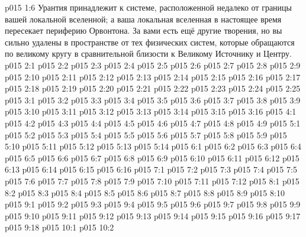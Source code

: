 \vs p015 1:6 Урантия принадлежит к системе, расположенной недалеко от границы вашей локальной вселенной; а ваша локальная вселенная в настоящее время пересекает периферию Орвонтона. За вами есть ещё другие творения, но вы сильно удалены в пространстве от тех физических систем, которые обращаются по великому кругу в сравнительной близости к Великому Источнику и Центру.
\vs p015 2:1 
\vs p015 2:2 \pc 
\vs p015 2:3 
\vs p015 2:4 
\vs p015 2:5 
\vs p015 2:6 
\vs p015 2:7 
\vs p015 2:8 
\vs p015 2:9 
\vs p015 2:10 \pc 
\vs p015 2:11 
\vs p015 2:12 
\vs p015 2:13 
\vs p015 2:14 
\vs p015 2:15 
\vs p015 2:16 
\vs p015 2:17 
\vs p015 2:18 
\vs p015 2:19 
\vs p015 2:20 
\vs p015 2:21 
\vs p015 2:22 
\vs p015 2:23 
\vs p015 2:24 
\vs p015 2:25 \pc 
{}
\vs p015 3:1 
\vs p015 3:2 
\vs p015 3:3 
\vs p015 3:4 \pc 
\vs p015 3:5 
\vs p015 3:6 
\vs p015 3:7 \pc 
\vs p015 3:8 
\vs p015 3:9 
\vs p015 3:10 
\vs p015 3:11 
\vs p015 3:12 
\vs p015 3:13 
\vs p015 3:14 
\vs p015 3:15 \pc 
\vs p015 3:16 \pc 
{}
\vs p015 4:1 
\vs p015 4:2 
\vs p015 4:3 
\vs p015 4:4 \pc 
\vs p015 4:5 \pc 
\vs p015 4:6 
\vs p015 4:7 
\vs p015 4:8 
\vs p015 4:9 
\vs p015 5:1 
\vs p015 5:2 
\vs p015 5:3 
\vs p015 5:4 
\vs p015 5:5 
\vs p015 5:6 
\vs p015 5:7 
\vs p015 5:8 
\vs p015 5:9 
\vs p015 5:10 
\vs p015 5:11 
\vs p015 5:12 
\vs p015 5:13 
\vs p015 5:14 \pc 
{}
\vs p015 6:1 
\vs p015 6:2 
\vs p015 6:3 
\vs p015 6:4 
\vs p015 6:5 
\vs p015 6:6 
\vs p015 6:7 \pc 
\vs p015 6:8 \pc 
\vs p015 6:9 
\vs p015 6:10 
\vs p015 6:11 \pc 
\vs p015 6:12 \pc 
\vs p015 6:13 
\vs p015 6:14 \pc 
\vs p015 6:15 
\vs p015 6:16 
\vs p015 7:1 
\vs p015 7:2 \pc 
\vs p015 7:3 \pc 
\vs p015 7:4 
\vs p015 7:5 \pc 
\vs p015 7:6 \pc 
\vs p015 7:7 \pc 
\vs p015 7:8 \pc 
\vs p015 7:9 \pc 
\vs p015 7:10 \pc 
\vs p015 7:11 
\vs p015 7:12 \pc 
{}
\vs p015 8:1 
\vs p015 8:2 
\vs p015 8:3 \pc 
\vs p015 8:4 
\vs p015 8:5 
\vs p015 8:6 
\vs p015 8:7 
\vs p015 8:8 
\vs p015 8:9 
\vs p015 8:10 
\vs p015 9:1 
\vs p015 9:2 
\vs p015 9:3 \pc 
\vs p015 9:4 
\vs p015 9:5 
\vs p015 9:6 
\vs p015 9:7 
\vs p015 9:8 
\vs p015 9:9 
\vs p015 9:10 
\vs p015 9:11 \pc 
\vs p015 9:12 
\vs p015 9:13 
\vs p015 9:14 
\vs p015 9:15 \pc 
\vs p015 9:16 
\vs p015 9:17 
\vs p015 9:18 \pc 
{}
\vs p015 10:1 
\vs p015 10:2 

